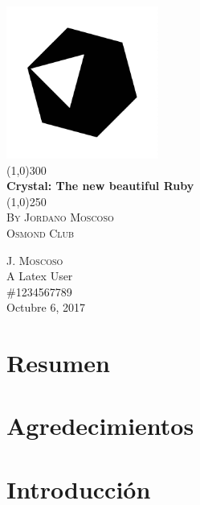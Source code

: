 \documentclass{article}
\begin{document}
\begin{titlepage}
	\begin{center}
	\includegraphics[width=5cm]{Title3-84413ce8.png}\\
	\line(1,0){300}\\
	[0.5cm]
	\huge{\bfseries Crystal: The new beautiful Ruby}\\
	[0.1cm]
	\line(1,0){250}\\
	\textsc{\LARGE By Jordano Moscoso}\\
	\textsc{\Large Osmond Club}\\
	[8cm]
	\end{center}
	\begin{flushright}
	\textsc{\large J. Moscoso}\\
	A Latex User \\
	\#1234567789 \\
	Octubre 6, 2017 \\
	\end{flushright}
\end{titlepage}

\section*{Resumen}\label{sec:summary}
\lipsum[1]
\lipsum[1]
\lipsum[1]
\cleardoublepage

\section*{Agredecimientos}\label{sec:acknowlegments}
\lipsum[1]
\cleardoublepage

\tableofcontents
\thispagestyle{empty}
\cleardoublepage

\listoffigures
{}
\cleardoublepage

\section{Introducción}\label{sec:intro}
\lipsum[1]
\lipsum[1]
\setcounter{page}{1}
\newpage
\end{document}
